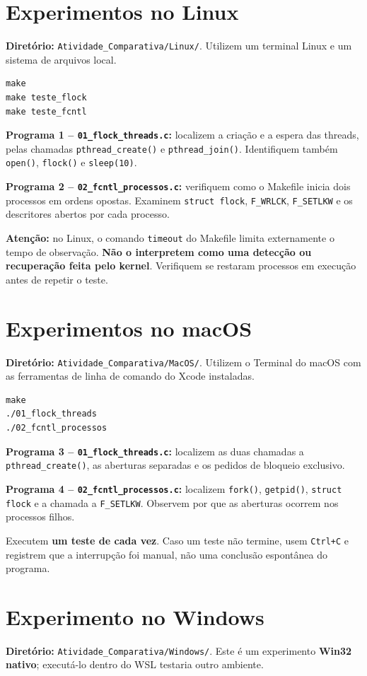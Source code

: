 \documentclass[11pt,a4paper]{article}
\newcommand{\emphbox}[1]{\vspace{2pt}\noindent\colorbox{fundo}{\parbox{\dimexpr\linewidth-2\fboxsep}{#1}}\vspace{2pt}}
\begin{document}
\section{Experimentos no Linux}
\textbf{Diretório:} \texttt{Atividade\_Comparativa/Linux/}. Utilizem um terminal Linux e um sistema de arquivos local.
\begin{lstlisting}[style=terminal]
make
make teste_flock
make teste_fcntl
\end{lstlisting}
\textbf{Programa 1 -- \texttt{01\_flock\_threads.c}:} localizem a criação e a espera das threads, pelas chamadas \texttt{pthread\_create()} e \texttt{pthread\_join()}. Identifiquem também \texttt{open()}, \texttt{flock()} e \texttt{sleep(10)}.

\textbf{Programa 2 -- \texttt{02\_fcntl\_processos.c}:} verifiquem como o Makefile inicia dois processos em ordens opostas. Examinem \texttt{struct flock}, \texttt{F\_WRLCK}, \texttt{F\_SETLKW} e os descritores abertos por cada processo.

\emphbox{\textbf{Atenção:} no Linux, o comando \texttt{timeout} do Makefile limita externamente o tempo de observação. \textbf{Não o interpretem como uma detecção ou recuperação feita pelo kernel}. Verifiquem se restaram processos em execução antes de repetir o teste.}

\section{Experimentos no macOS}
\textbf{Diretório:} \texttt{Atividade\_Comparativa/MacOS/}. Utilizem o Terminal do macOS com as ferramentas de linha de comando do Xcode instaladas.
\begin{lstlisting}[style=terminal]
make
./01_flock_threads
./02_fcntl_processos
\end{lstlisting}
\textbf{Programa 3 -- \texttt{01\_flock\_threads.c}:} localizem as duas chamadas a \texttt{pthread\_create()}, as aberturas separadas e os pedidos de bloqueio exclusivo.

\textbf{Programa 4 -- \texttt{02\_fcntl\_processos.c}:} localizem \texttt{fork()}, \texttt{getpid()}, \texttt{struct flock} e a chamada a \texttt{F\_SETLKW}. Observem por que as aberturas ocorrem nos processos filhos.

Executem \textbf{um teste de cada vez}. Caso um teste não termine, usem \texttt{Ctrl+C} e registrem que a interrupção foi manual, não uma conclusão espontânea do programa.

\newpage
\section{Experimento no Windows}
\textbf{Diretório:} \texttt{Atividade\_Comparativa/Windows/}. Este é um experimento \textbf{Win32 nativo}; executá-lo dentro do WSL testaria outro ambiente.
\end{document}
